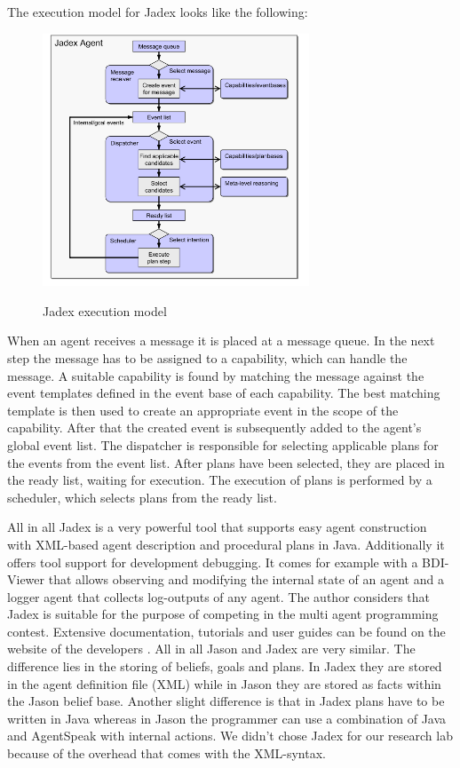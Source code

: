The execution model for Jadex looks like the following:
\begin{figure}
	\centering
	\includegraphics[width=300px]{images/Jadex_execution_model.png}
	\label{fig4}
	\caption{Jadex execution model \cite{Pokahr}}
\end{figure}
\newline
When an agent receives a message it is placed at a message queue.
In the next step the message has to be assigned to a capability, which can handle the message.
A suitable capability is found by matching the message against the event templates defined in the event base of each capability.
The best matching template is then used to create an appropriate event in the scope of the capability.
After that the created event is subsequently added to the agent's global event list.
The dispatcher is responsible for selecting applicable plans for the events from the event list.
After plans have been selected, they are placed in the ready list, waiting for execution.
The execution of plans is performed by a scheduler, which selects plans from the ready list.

All in all Jadex is a very powerful tool that supports easy agent construction with XML-based agent description and procedural plans in Java.
Additionally it offers tool support for development debugging.
It comes for example with a BDI-Viewer that allows observing and modifying the internal state of an agent and a logger agent that collects log-outputs of any agent.
The author considers that Jadex is suitable for the purpose of competing in the multi agent programming contest.
Extensive documentation, tutorials and user guides can be found on the website of the developers \cite{Jadex}.
All in all Jason and Jadex are very similar. The difference lies in the storing of beliefs, goals and plans. In Jadex they are stored in the agent definition file (XML) while in Jason they are stored as facts within the Jason belief base. Another slight difference is that in Jadex plans have to be written in Java whereas in Jason the programmer can use a combination of Java and AgentSpeak with internal actions. We didn't chose Jadex for our research lab because of the overhead that comes with the XML-syntax.

